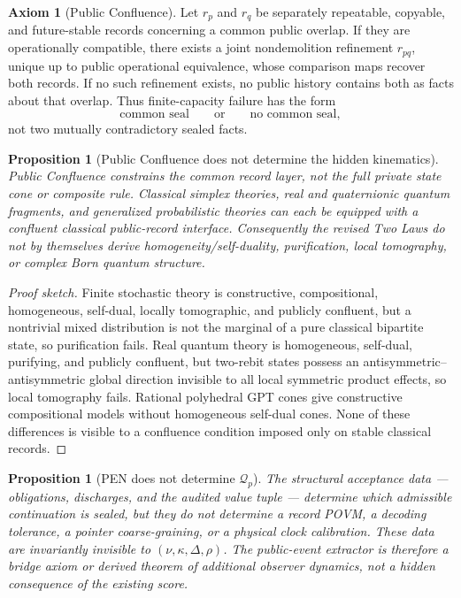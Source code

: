 \documentclass[11pt]{article}
\theoremstyle{plain}
\newtheorem{proposition}[theorem]{Proposition}
\theoremstyle{definition}
\newtheorem{axiom}[theorem]{Axiom}
\theoremstyle{remark}
\newenvironment{proofsketch}{\begin{proof}[Proof sketch]}{\end{proof}}
\begin{document}
\begin{axiom}[Public Confluence]
Let \(r_p\) and \(r_q\) be separately repeatable, copyable, and future-stable records concerning a common public overlap. If they are operationally compatible, there exists a joint nondemolition refinement \(r_{pq}\), unique up to public operational equivalence, whose comparison maps recover both records. If no such refinement exists, no public history contains both as facts about that overlap. Thus finite-capacity failure has the form
\[
\text{common seal}
\qquad\text{or}\qquad
\text{no common seal},
\]
not two mutually contradictory sealed facts.
\end{axiom}

\begin{proposition}[Public Confluence does not determine the hidden kinematics]
Public Confluence constrains the common record layer, not the full private state cone or composite rule. Classical simplex theories, real and quaternionic quantum fragments, and generalized probabilistic theories can each be equipped with a confluent classical public-record interface. Consequently the revised Two Laws do not by themselves derive homogeneity/self-duality, purification, local tomography, or complex Born quantum structure.
\end{proposition}

\begin{proofsketch}
Finite stochastic theory is constructive, compositional, homogeneous, self-dual, locally tomographic, and publicly confluent, but a nontrivial mixed distribution is not the marginal of a pure classical bipartite state, so purification fails. Real quantum theory is homogeneous, self-dual, purifying, and publicly confluent, but two-rebit states possess an antisymmetric--antisymmetric global direction invisible to all local symmetric product effects, so local tomography fails. Rational polyhedral GPT cones give constructive compositional models without homogeneous self-dual cones. None of these differences is visible to a confluence condition imposed only on stable classical records.
\end{proofsketch}

\begin{proposition}[PEN does not determine \(\mathcal{Q}_p\)]
The structural acceptance data --- obligations, discharges, and the audited value tuple --- determine which admissible continuation is sealed, but they do not determine a record POVM, a decoding tolerance, a pointer coarse-graining, or a physical clock calibration. These data are invariantly invisible to \((\nu,\kappa,\Delta,\rho)\). The public-event extractor is therefore a bridge axiom or derived theorem of additional observer dynamics, not a hidden consequence of the existing score.
\end{proposition}
\end{document}

